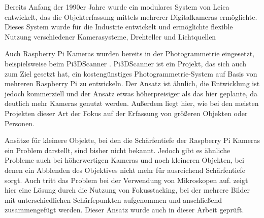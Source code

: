 \documentclass[./00PhotoBox.tex]{subfiles}
\begin{document}
Bereits Anfang der 1990er Jahre wurde ein modulares System von Leica entwickelt, das die Objekterfassung mittels mehrerer Digitalkameras ermöglichte.  Dieses System wurde für die Industrie entwickelt und ermöglichte flexible Nutzung verschiedener Kamerasysteme, Drehteller und Lichtquellen 
\citep{leica_pom}

Auch Raspberry Pi Kameras wurden bereits in der Photogrammetrie eingesetzt, beispielsweise beim Pi3DScanner \citep{pi3dscanner}. Pi3DScanner ist ein Projekt, das sich auch zum Ziel gesetzt hat, ein kostengünstiges Photo\-gram\-metrie-System auf Basis von mehreren Raspberry Pi zu entwickeln. Der Ansatz ist ähnlich, die Entwicklung ist jedoch kommerziell und der Ansatz etwas höherpreisiger als das hier geplante, da deutlich mehr Kameras genutzt werden. Außerdem liegt hier, wie bei den meisten Projekten dieser Art der Fokus auf der Erfassung von größeren Objekten oder Personen.
\citep{pi3dscanner}

Ansätze für kleinere Objekte, bei den die Schärfentiefe der Raspberry Pi Kameras ein Problem darstellt, sind bisher nicht bekannt. Jedoch gibt es ähnliche Probleme auch bei höherwertigen Kameras und noch kleineren Objekten, bei denen ein Abblenden des Objektives nicht mehr für ausreichend Schärfentiefe sorgt. Auch tritt das Problem bei der Verwendung von Mikroskopen auf. \cite{focusstack_sfm} zeigt hier eine Lösung durch die Nutzung von Fokusstacking, bei der mehrere Bilder mit unterschiedlichen Schärfepunkten aufgenommen und anschließend zusammengefügt werden. Dieser Ansatz wurde auch in dieser Arbeit geprüft.


\biblio
\end{document}
